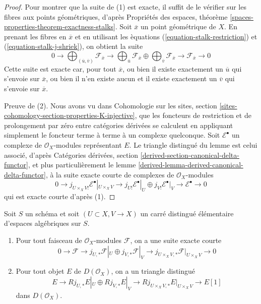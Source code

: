 \begin{proof}
Pour montrer que la suite de (1) est exacte, il suffit de le v\'erifier sur
les fibres aux points g\'eom\'etriques, d'apr\`es Propri\'et\'es des espaces,
th\'eor\`eme
\ref{spaces-properties-theorem-exactness-stalks}.
Soit $\overline{x}$ un point g\'eom\'etrique de $X$. En prenant les fibres en
$\overline{x}$ et en utilisant les \`equations
(\ref{equation-stalk-restriction}) et (\ref{equation-stalk-j-shriek}), on
obtient la suite
$$
0 \to
\bigoplus\nolimits_{(\overline{u}, \overline{v})} \mathcal{F}_{\overline{x}}
\to
\bigoplus\nolimits_{\overline{u}} \mathcal{F}_{\overline{x}}
\oplus
\bigoplus\nolimits_{\overline{v}} \mathcal{F}_{\overline{x}}
\to
\mathcal{F}_{\overline{x}} \to 0
$$
Cette suite est exacte car, pour tout $\overline{x}$, ou bien il existe
exactement un $\overline{u}$ qui s'envoie sur $\overline{x}$, ou bien il
n'en existe aucun et il existe exactement un $\overline{v}$ qui s'envoie
sur $\overline{x}$.

\medskip\noindent
Preuve de (2). Nous avons vu dans Cohomologie sur les sites, section
\ref{sites-cohomology-section-properties-K-injective}, que les foncteurs de
restriction et de prolongement par z\'ero entre cat\'egories d\'eriv\'ees se
calculent en appliquant simplement le foncteur terme \`a terme \`a un
complexe quelconque. Soit $\mathcal{E}^\bullet$ un complexe de
$\mathcal{O}_X$-modules repr\'esentant $E$. Le triangle distingu\'e du lemme
est celui associ\'e, d'apr\`es Cat\'egories d\'eriv\'ees, section
\ref{derived-section-canonical-delta-functor}, et plus particuli\`erement le
lemme \ref{derived-lemma-derived-canonical-delta-functor}, \`a la suite exacte
courte de complexes de $\mathcal{O}_X$-modules
$$
0 \to j_{U \times_X V!}\mathcal{E}^\bullet|_{U \times_X V} \to
j_{U!}\mathcal{E}^\bullet|_U \oplus j_{V!}\mathcal{E}^\bullet|_V
\to \mathcal{E}^\bullet \to 0
$$
qui est exacte courte d'apr\`es (1).
\end{proof}

\begin{lemma}
\label{lemma-exact-sequence-j-star}
Soit $S$ un sch\'ema et soit $(U \subset X, V \to X)$ un carr\'e distingu\'e
\'el\'ementaire d'espaces alg\'ebriques sur $S$.
\begin{enumerate}
\item Pour tout faisceau de $\mathcal{O}_X$-modules $\mathcal{F}$, on a une
suite exacte courte
$$
0 \to \mathcal{F} \to
j_{U, *}\mathcal{F}|_U \oplus j_{V, *}\mathcal{F}|_V \to
j_{U \times_X V, *}\mathcal{F}|_{U \times_X V} \to 0
$$
\item Pour tout objet $E$ de $D(\mathcal{O}_X)$, on a un triangle distingu\'e
$$
E \to 
Rj_{U, *}E|_U \oplus Rj_{V, *}E|_V \to
Rj_{U \times_X V, *}E|_{U \times_X V} \to
E[1]
$$
dans $D(\mathcal{O}_X)$.
\end{enumerate}
\end{lemma}

